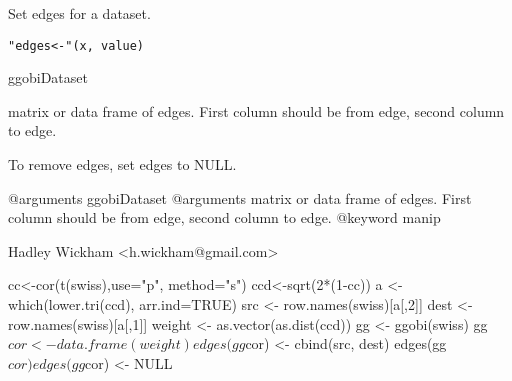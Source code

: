 \documentclass{article}
\begin{document}
\begin{Description}\relax
Set edges for a dataset.
\end{Description}
\begin{Usage}
\begin{verbatim}"edges<-"(x, value)\end{verbatim}
\end{Usage}
\begin{Arguments}
\begin{ldescription}
\item[\code{x}] ggobiDataset
\item[\code{value}] matrix or data frame of edges.  First column should be from edge, second column to edge.
\end{ldescription}
\end{Arguments}
\begin{Details}\relax
To remove edges, set edges to NULL.

@arguments ggobiDataset
@arguments matrix or data frame of edges.  First column should be from edge, second column to edge.
@keyword manip
\end{Details}
\begin{Author}\relax
Hadley Wickham <h.wickham@gmail.com>
\end{Author}
\begin{Examples}
\begin{ExampleCode}cc<-cor(t(swiss),use="p", method="s") 
ccd<-sqrt(2*(1-cc)) 
a <- which(lower.tri(ccd), arr.ind=TRUE)
src <- row.names(swiss)[a[,2]]
dest <- row.names(swiss)[a[,1]] 
weight <- as.vector(as.dist(ccd))
gg <- ggobi(swiss)
gg$cor <- data.frame(weight)
edges(gg$cor) <- cbind(src, dest)
edges(gg$cor)
edges(gg$cor) <- NULL\end{ExampleCode}
\end{Examples}
\end{document}
